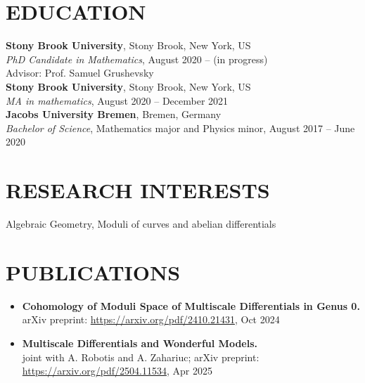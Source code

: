 \documentclass[margin]{res}
\begin{document}

\address{700 Health Sciences Drive\\Chapin-B-1015C\\11790 Stony Brook, New York, US}
\address{prabhat.devkota@stonybrook.edu}

\begin{resume}

  \section{EDUCATION}
  \textbf{Stony Brook University}, Stony Brook, New York, US\\
  {\sl PhD Candidate in Mathematics}, August 2020 -- (in progress)\\
  Advisor: Prof. Samuel Grushevsky\\

  \textbf{Stony Brook University}, Stony Brook, New York, US\\
  {\sl MA in mathematics}, August 2020 -- December 2021\\
  
\textbf{Jacobs University Bremen}, Bremen, Germany\\
{\sl Bachelor of Science}, Mathematics major and Physics minor, August 2017 -- June 2020
\\
\section{RESEARCH INTERESTS}
Algebraic Geometry, Moduli of curves and abelian differentials
\\

\section{PUBLICATIONS}
\begin{itemize}
\item \textbf{Cohomology of Moduli Space of Multiscale Differentials in Genus 0.}\\arXiv preprint: \url{https://arxiv.org/pdf/2410.21431}, Oct 2024
\item \textbf{Multiscale Differentials and Wonderful Models.}\\joint with A. Robotis and A. Zahariuc; arXiv preprint: \url{https://arxiv.org/pdf/2504.11534}, Apr 2025
  \end{itemize}


\end{resume}
\end{document}
